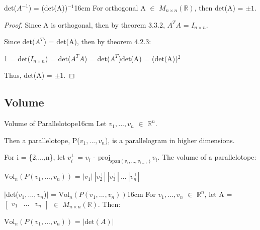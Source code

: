     \vspace{0.5cm}



    \begin{corollary}{det($A^{-1}$) = (det(A))$^{-1}$}{16cm}
        For orthogonal A $\in$ $M_{n \times n}(\mathbb{R})$,
        then det(A) = $\pm 1$.
    \end{corollary}

    \begin{proof}
        Since A is orthogonal, then by {\color{red} theorem 3.3.2},
        $A^TA$ = $I_{n \times n}$.
        
        Since det($A^T$) = det(A), then by {\color{red} theorem 4.2.3}:

        \hspace{0.5cm}
        1 = det($I_{n \times n}$)
        = det($A^TA$)
        = det($A^T$)det(A)
        = (det(A))$^2$

        Thus, det(A) = $\pm 1$.
    \end{proof}

    \newpage



\subsection{ Volume }

    \begin{definition}{Volume of Parallelotope}{16cm}
        Let $v_1,...,v_n$ $\in$ $\mathbb{R}^n$.

        Then a {\color{lblue} parallelotope}, P($v_1,...,v_n$),
        is a parallelogram in higher dimensions.

        For i = \{2,...,n\}, let
        $v_i^{\perp}$ = $v_i$ - $\text{proj}_{\text{span}(v_1,...,v_{i-1})}v_i$.
        The volume of a parallelotope:

        \hspace{0.5cm}
        $\text{Vol}_n(P(v_1,...,v_n))$
        = $|v_1| \ |v_2^{\perp}| \ |v_3^{\perp}| \ ... \ |v_n^{\perp}|$
    \end{definition}

    \vspace{0.5cm}



    \begin{wtheorem}{$|$det($v_1,...,v_n$)$|$ = $\text{Vol}_n(P(v_1,...,v_n))$}{16cm}
        For $v_1,...,v_n$ $\in$ $\mathbb{R}^n$,
        let A =
        $\begin{bmatrix}
            v_1 & ... & v_n 
        \end{bmatrix}$
        $\in$ $M_{n \times n}(\mathbb{R})$. Then:

        \hspace{0.5cm}
        $\text{Vol}_n(P(v_1,...,v_n))$
        = $|\text{det}(A)|$
    \end{wtheorem}


